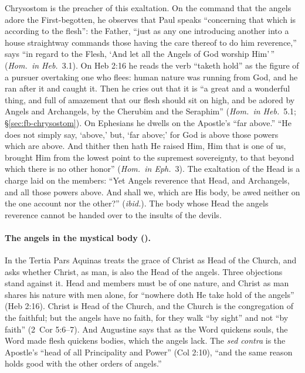 Chrysostom is the preacher of this exaltation. On the command that the
angels adore the First-begotten, he observes that Paul speaks ``concerning
that which is according to the flesh'': the Father, ``just as any one
introducing another into a house straightway commands those having the care
thereof to do him reverence,'' says ``in regard to the Flesh, `And let all
the Angels of God worship Him'\,'' (\emph{Hom.\ in Heb.}\ 3.1). On Heb 2:16
he reads the verb ``taketh hold'' as the figure of a pursuer overtaking one
who flees: human nature was running from God, and he ran after it and
caught it. Then he cries out that it is ``a great and a wonderful thing, and
full of amazement that our flesh should sit on high, and be adored by Angels
and Archangels, by the Cherubim and the Seraphim'' (\emph{Hom.\ in Heb.}\
5.1; \S\ref{sec:fb-chrysostom}). On Ephesians he dwells on the Apostle's ``far above.'' ``He does
not simply say, `above,' but, `far above;' for God is above those powers
which are above. And thither then hath He raised Him, Him that is one of
us, brought Him from the lowest point to the supremest sovereignty, to that
beyond which there is no other honor'' (\emph{Hom.\ in Eph.}\ 3). The
exaltation of the Head is a charge laid on the members: ``Yet Angels
reverence that Head, and Archangels, and all those powers above. And shall
we, which are His body, be awed neither on the one account nor the other?''
(\emph{ibid.}). The body whose Head the angels reverence cannot be handed
over to the insults of the devils.

\paragraph{The angels in the mystical body ().} In the
Tertia Pars Aquinas treats the grace of Christ as Head of the Church, and
asks whether Christ, as man, is also the Head of the angels. Three
objections stand against it. Head and members must be of one nature, and
Christ as man shares his nature with men alone, for ``nowhere doth He take
hold of the angels'' (Heb 2:16). Christ is Head of the Church, and the
Church is the congregation of the faithful; but the angels have no faith,
for they walk ``by sight'' and not ``by faith'' (2~Cor 5:6--7). And
Augustine says that as the Word quickens souls, the Word made flesh quickens
bodies, which the angels lack. The \emph{sed contra} is the Apostle's
``head of all Principality and Power'' (Col 2:10), ``and the same reason
holds good with the other orders of angels.''

